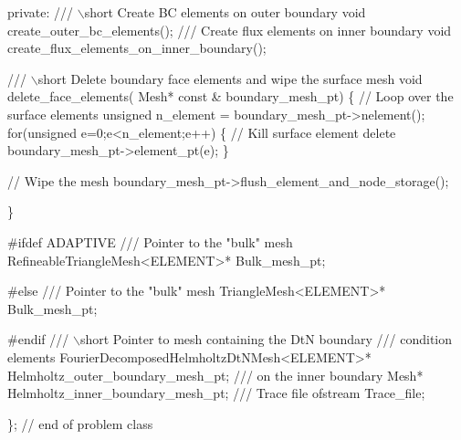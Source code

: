 \begin{DoxyCodeInclude}
\textcolor{keyword}{private}:
 \textcolor{comment}{}
\textcolor{comment}{ /// \(\backslash\)short Create BC elements on outer boundary}
\textcolor{comment}{} \textcolor{keywordtype}{void} create\_outer\_bc\_elements();
 \textcolor{comment}{}
\textcolor{comment}{ /// Create flux elements on inner boundary}
\textcolor{comment}{} \textcolor{keywordtype}{void} create\_flux\_elements\_on\_inner\_boundary();
 
 \textcolor{comment}{}
\textcolor{comment}{ /// \(\backslash\)short Delete boundary face elements and wipe the surface mesh}
\textcolor{comment}{} \textcolor{keywordtype}{void} delete\_face\_elements( Mesh* \textcolor{keyword}{const} & boundary\_mesh\_pt)
  \{
   \textcolor{comment}{// Loop over the surface elements}
   \textcolor{keywordtype}{unsigned} n\_element = boundary\_mesh\_pt->nelement();
   \textcolor{keywordflow}{for}(\textcolor{keywordtype}{unsigned} e=0;e<n\_element;e++)
    \{
     \textcolor{comment}{// Kill surface element}
     \textcolor{keyword}{delete}  boundary\_mesh\_pt->element\_pt(e);
    \}
   
   \textcolor{comment}{// Wipe the mesh}
   boundary\_mesh\_pt->flush\_element\_and\_node\_storage();
   
  \} 

\textcolor{preprocessor}{#ifdef ADAPTIVE}
\textcolor{comment}{}
\textcolor{comment}{ /// Pointer to the "bulk" mesh}
\textcolor{comment}{} RefineableTriangleMesh<ELEMENT>* Bulk\_mesh\_pt;

\textcolor{preprocessor}{#else}
\textcolor{comment}{}
\textcolor{comment}{ /// Pointer to the "bulk" mesh}
\textcolor{comment}{} TriangleMesh<ELEMENT>* Bulk\_mesh\_pt;

\textcolor{preprocessor}{#endif}
  \textcolor{comment}{}
\textcolor{comment}{ /// \(\backslash\)short Pointer to mesh containing the DtN boundary}
\textcolor{comment}{ /// condition elements}
\textcolor{comment}{} FourierDecomposedHelmholtzDtNMesh<ELEMENT>* Helmholtz\_outer\_boundary\_mesh\_pt;
\textcolor{comment}{}
\textcolor{comment}{ /// on the inner boundary}
\textcolor{comment}{} Mesh* Helmholtz\_inner\_boundary\_mesh\_pt;
\textcolor{comment}{}
\textcolor{comment}{ /// Trace file}
\textcolor{comment}{} ofstream Trace\_file;

\}; \textcolor{comment}{// end of problem class}




\end{DoxyCodeInclude}
